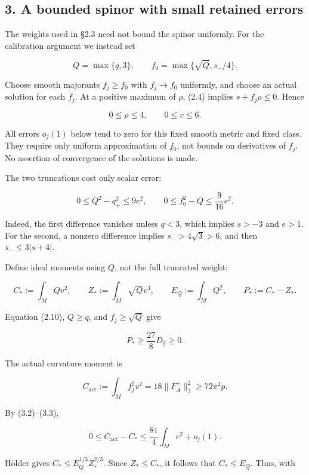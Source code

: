 \documentclass[
  10pt,
]{article}
\begin{document}
\hypertarget{a-bounded-spinor-with-small-retained-errors}{%
\subsection{3. A bounded spinor with small retained
errors}\label{a-bounded-spinor-with-small-retained-errors}}

The weights used in §2.3 need not bound the spinor uniformly. For the
calibration argument we instead set

\[
       Q=\max\{q,3\},\qquad
       f_0=\max\{\sqrt Q,s_-/4\}.                        \tag{3.1}
\]

Choose smooth majorants \(f_j\ge f_0\) with \(f_j\to f_0\) uniformly,
and choose an actual solution for each \(f_j\). At a positive maximum of
\(\rho\), (2.4) implies \(s+f_j\rho\le0\). Hence

\[
                           0\le\rho\le4,\qquad 0\le v\le6.
 \tag{3.2}
\]

All errors \(o_j(1)\) below tend to zero for this fixed smooth metric
and fixed class. They require only uniform approximation of \(f_0\), not
bounds on derivatives of \(f_j\). No assertion of convergence of the
solutions is made.

The two truncations cost only scalar error:

\[
 0\le Q^2-q_+^2\le9e^2,\qquad
 0\le f_0^2-Q\le\frac9{16}e^2.                          \tag{3.3}
\]

Indeed, the first difference vanishes unless \(q<3\), which implies
\(s>-3\) and \(e>1\). For the second, a nonzero difference implies
\(s_->4\sqrt3>6\), and then \(s_-\le3|s+4|\).

Define ideal moments using \(Q\), not the full truncated weight:

\[
 C_*:=\int_M Qv^2,\qquad Z_*:=\int_M\sqrt Qv^3,
 \qquad E_Q:=\int_M Q^2,\qquad P_*:=C_*-Z_*.
 \tag{3.4}
\]

Equation (2.10), \(Q\ge q\), and \(f_j\ge\sqrt Q\) give

\[
 P_*\ge\frac{27}{8}D_0\ge0.                            \tag{3.5}
\]

The actual curvature moment is

\[
 C_{\mathrm{act}}:=\int_M f_j^2v^2
                      =18\|F_A^+\|_2^2\ge72\pi^2p.
\]

By (3.2)--(3.3),

\[
 0\le C_{\mathrm{act}}-C_*
                     \le\frac{81}{4}\int_M e^2+o_j(1).
\]

Hölder gives \(C_*\le E_Q^{1/3}Z_*^{2/3}\). Since \(Z_*\le C_*\), it
follows that \(C_*\le E_Q\). Thus, with
\end{document}
